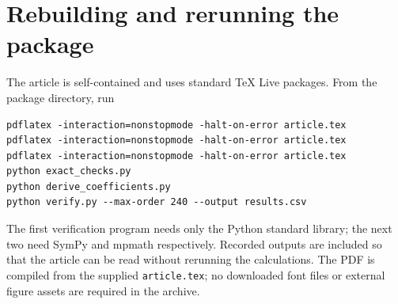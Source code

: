 \documentclass[11pt,a4paper]{article}
\theoremstyle{definition}
\numberwithin{equation}{section}
\begin{document}
\section{Rebuilding and rerunning the package}
The article is self-contained and uses standard TeX Live packages. From the package directory, run
\begin{verbatim}
pdflatex -interaction=nonstopmode -halt-on-error article.tex
pdflatex -interaction=nonstopmode -halt-on-error article.tex
pdflatex -interaction=nonstopmode -halt-on-error article.tex
python exact_checks.py
python derive_coefficients.py
python verify.py --max-order 240 --output results.csv
\end{verbatim}
The first verification program needs only the Python standard library; the next two need SymPy and mpmath respectively. Recorded outputs are included so that the article can be read without rerunning the calculations. The PDF is compiled from the supplied \texttt{article.tex}; no downloaded font files or external figure assets are required in the archive.
\end{document}

